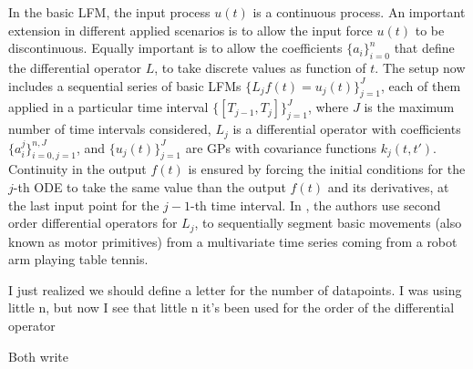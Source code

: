\documentclass[journal]{IEEEtran}
\newcommand{\mauricio}[1]{{\color{blue}#1}}
\newcommand{\simo}[1]{{\color{red}#1}}
\begin{document}
In the basic LFM, the input process $u(t)$ is a continuous process. An important extension in different applied scenarios
is to allow the input force $u(t)$ to be discontinuous. Equally important is to allow the coefficients $\{a_i\}_{i=0}^n$ that
define the differential operator $L$, to take discrete values as function of $t$. The setup now includes a sequential
series of basic LFMs $\{L_jf(t) = u_j(t)\}_{j=1}^J$, each of them applied in a particular time interval
$\{[T_{j-1}, T_j]\}_{j=1}^J$, where $J$ is the maximum number of time intervals considered, $L_j$ is a differential operator
with coefficients $\{a_i^j\}_{i=0,j=1}^{n, J}$, and $\{u_j(t)\}_{j=1}^J$ are GPs with covariance functions $k_j(t,t')$.
Continuity in the output $f(t)$ is ensured by forcing the initial conditions for the $j$-th ODE to take the same value
than the output $f(t)$ and its derivatives, at the last input point for the $j-1$-th time interval.
In \cite{Alvarez:switched11}, the authors use second order differential operators for $L_j$, to sequentially segment
basic movements (also known as motor primitives) from a multivariate time series coming from a robot arm playing table
tennis.

\mauricio{I just realized we should define a letter for the number of datapoints. I was using little n, but now I see
that little n it's been used for the order of the differential operator}

\simo{Both write}
\end{document}
